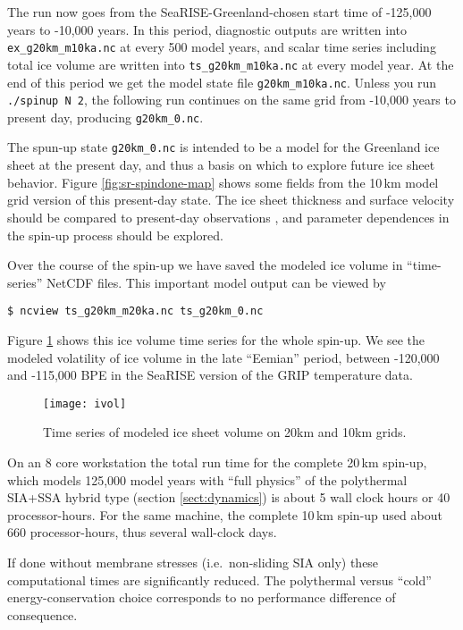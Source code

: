 The run now goes from the SeaRISE-Greenland-chosen start time of -125,000 years to -10,000 years.  In this period, diagnostic outputs are written into \texttt{ex_g20km_m10ka.nc} at every 500 model years, and scalar time series including total ice volume are written into \texttt{ts_g20km_m10ka.nc} at every model year.  At the end of this period we get the model state file \texttt{g20km_m10ka.nc}. Unless you run \texttt{./spinup N 2}, the following run continues on the same grid from -10,000 years to present day, producing \texttt{g20km_0.nc}.

The spun-up state \texttt{g20km_0.nc} is intended to be a model for the Greenland ice sheet at the present day, and thus a basis on which to explore future ice sheet behavior.  Figure \ref{fig:sr-spindone-map} shows some fields from the 10\,km model grid version of this present-day state.  The ice sheet thickness and surface velocity should be compared to present-day observations \cite{BKAJS}, and parameter dependences in the spin-up process should be explored.

Over the course of the spin-up we have saved the modeled ice volume in ``time-series'' NetCDF files.  This important model output can be viewed by
\begin{verbatim}
$ ncview ts_g20km_m20ka.nc ts_g20km_0.nc
\end{verbatim}
\noindent Figure \ref{fig:sr-spindone-ivolboth} shows this ice volume time series for the whole spin-up.  We see the modeled volatility of ice volume in the late ``Eemian'' period, between -120,000 and -115,000 BPE in the SeaRISE version of the GRIP temperature data.

\begin{figure}[ht]
\centering
\texttt{[image: ivol]}
\caption{Time series of modeled ice sheet volume on 20km and 10km grids.}
\label{fig:sr-spindone-ivolboth}
\end{figure}

On an 8 core workstation the total run time for the complete 20\,km spin-up, which models 125,000 model years with ``full physics'' of the polythermal SIA+SSA hybrid type (section \ref{sect:dynamics}) is about 5 wall clock hours or 40 processor-hours.  For the same machine, the complete 10\,km spin-up used about 660 processor-hours, thus several wall-clock days.

If done without membrane stresses (i.e.~non-sliding SIA only) these computational times are significantly reduced.  The polythermal versus ``cold'' energy-conservation choice corresponds to no performance difference of consequence.


